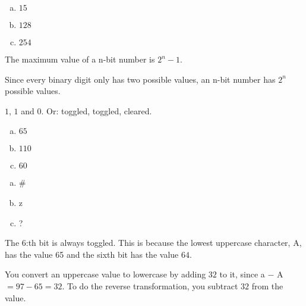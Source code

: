 \begin{Answer}[ref={bin-to-n}]
  \begin{enumerate}[(a)]
  \item $15$
  \item $128$
  \item $254$
  \end{enumerate}
\end{Answer}

\begin{Answer}[ref={n-bits-max-val}]
  The maximum value of a n-bit number is $2^n - 1$.

  Since every binary digit only has two possible values, an n-bit
  number has $2^n$ possible values.
\end{Answer}

\begin{Answer}[ref={bits-value-order}]
  $1$, $1$ and $0$. Or: toggled, toggled, cleared.

\end{Answer}

\begin{Answer}[ref={ascii-to-num}]

  \begin{enumerate}[(a)]
  \item $65$
  \item $110$
  \item $60$
  \end{enumerate}

\end{Answer}

\begin{Answer}[ref={num-to-ascii}]

  \begin{enumerate}[(a)]
  \item \#
  \item z
  \item ?
  \end{enumerate}

\end{Answer}

\begin{Answer}[ref={ascii-uppercase}]

  The 6:th bit is always toggled. This is because the lowest uppercase
  character, A, has the value 65 and the sixth bit has the value $64$.
\end{Answer}

\begin{Answer}[ref={uppercase-conv}]

  You convert an uppercase \ascii value to lowercase by adding $32$ to
  it, since a $-$ A $= 97 - 65 = 32$. To do the reverse transformation,
  you subtract $32$ from the value.

\end{Answer}

